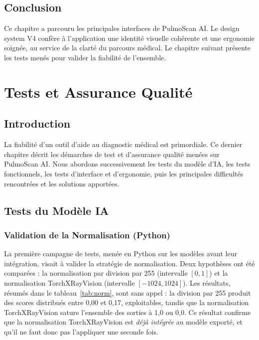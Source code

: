 \documentclass[12pt,a4paper]{report}
\begin{document}
\section*{Conclusion}
Ce chapitre a parcouru les principales interfaces de PulmoScan AI. Le design system V4 confère à l'application une identité visuelle cohérente et une ergonomie soignée, au service de la clarté du parcours médical. Le chapitre suivant présente les tests menés pour valider la fiabilité de l'ensemble.

\chapter{Tests et Assurance Qualité}

\section*{Introduction}
La fiabilité d'un outil d'aide au diagnostic médical est primordiale. Ce dernier chapitre décrit les démarches de test et d'assurance qualité menées sur PulmoScan AI. Nous abordons successivement les tests du modèle d'IA, les tests fonctionnels, les tests d'interface et d'ergonomie, puis les principales difficultés rencontrées et les solutions apportées.

\section{Tests du Modèle IA}

\subsection{Validation de la Normalisation (Python)}
La première campagne de tests, menée en Python sur les modèles avant leur intégration, visait à valider la stratégie de normalisation. Deux hypothèses ont été comparées : la normalisation par division par 255 (intervalle $[0,1]$) et la normalisation TorchXRayVision (intervalle $[-1024, 1024]$). Les résultats, résumés dans le tableau~\ref{tab:norm}, sont sans appel : la division par 255 produit des scores distribués entre 0,00 et 0,17, exploitables, tandis que la normalisation TorchXRayVision sature l'ensemble des sorties à 1,0 ou 0,0. Ce résultat confirme que la normalisation TorchXRayVision est \emph{déjà intégrée} au modèle exporté, et qu'il ne faut donc pas l'appliquer une seconde fois.
\end{document}
